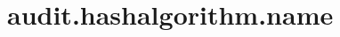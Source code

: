 \section{audit.hashalgorithm.name}
\label{configuration:AuditHashalgorithmName}
\AvailableInJavaOnly{\TODO}